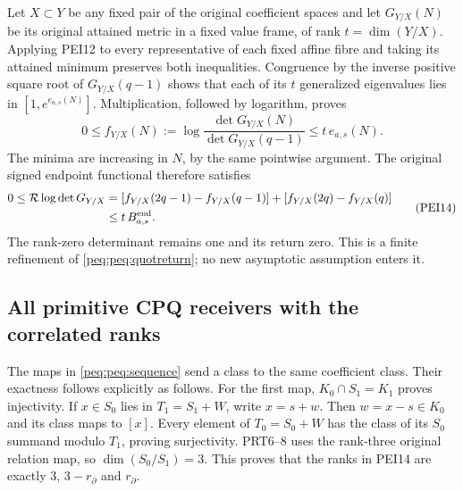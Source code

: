 \documentclass[11pt,a4paper]{article}
\begin{document}
Let $X\subset Y$ be any fixed pair of the original coefficient
spaces and let $G_{Y/X}(N)$ be its original attained metric in a
fixed value frame, of rank $t=\dim(Y/X)$. Applying PEI12 to every
representative of each fixed affine fibre and taking its attained
minimum preserves both inequalities. Congruence by the inverse
positive square root of $G_{Y/X}(q-1)$ shows that each of its $t$
generalized eigenvalues lies in $[1,e^{e_{a,s}(N)}]$. Multiplication,
followed by logarithm, proves
\[
 0\le f_{Y/X}(N):=
       \log\frac{\det G_{Y/X}(N)}{\det G_{Y/X}(q-1)}
       \le t\,e_{a,s}(N).
                                                               \tag{PEI13}
\]
The minima are increasing in $N$, by the same pointwise argument.
The original signed endpoint functional therefore satisfies
\[
 \begin{split}
 0\le\mathcal R\log\det G_{Y/X}
   &=[f_{Y/X}(2q-1)-f_{Y/X}(q-1)]
          +[f_{Y/X}(2q)-f_{Y/X}(q)]\\
   &\le t\,B^{\rm end}_{a,s}.
 \end{split}                                                     \tag{PEI14}
\]
The rank-zero determinant remains one and its return zero.
This is a finite refinement of \eqref{peq:peq:quotreturn}; no new
asymptotic assumption enters it.

\subsection{All primitive CPQ receivers with the correlated ranks}

The maps in \eqref{peq:peq:sequence} send a class to the same coefficient
class. Their exactness follows explicitly as follows. For the first
map, $K_0\cap S_1=K_1$ proves injectivity. If $x\in S_0$ lies in
$T_1=S_1+W$, write $x=s+w$. Then $w=x-s\in K_0$ and its class
maps to $[x]$. Every element of $T_0=S_0+W$ has the class of its
$S_0$ summand modulo $T_1$, proving surjectivity. PRT6--8 uses the
rank-three original relation map, so $\dim(S_0/S_1)=3$.
This proves that the ranks in PEI14 are exactly $3$, $3-r_\partial$
and $r_\partial$.
\end{document}
